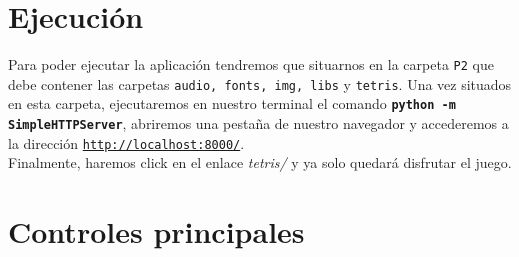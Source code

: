 \documentclass[11pt,a4paper]{article}
\begin{document}
\section{Ejecución}

Para poder ejecutar la aplicación tendremos que situarnos en la carpeta \texttt{P2} que debe contener las carpetas \texttt{audio, fonts, img, libs} y \texttt{tetris}. Una vez situados en esta carpeta, ejecutaremos en nuestro terminal el comando \texttt{\textbf{python -m SimpleHTTPServer}}, abriremos una pestaña de nuestro navegador y accederemos a la dirección \href{http://localhost:8000/}{\texttt{http://localhost:8000/}}.\\

Finalmente, haremos click en el enlace \textit{tetris/} y ya solo quedará disfrutar el juego.

\section{Controles principales}
\end{document}
